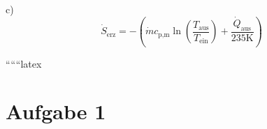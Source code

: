 c) \\
\[
\dot{S}_{\text{erz}} = - \left( \dot{m} c_{\text{p,m}} \ln \left( \frac{T_{\text{aus}}}{T_{\text{ein}}} \right) + \frac{\dot{Q}_{\text{aus}}}{235 \text{K}} \right)
\]

``````latex


\section*{Aufgabe 1}